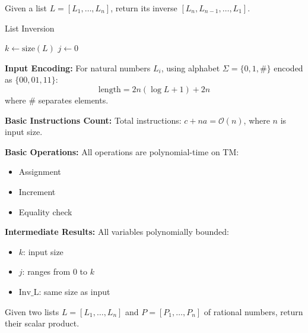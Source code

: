 \begin{ex}[FP function]
	Given a list $L = [L_1,\ldots,L_n]$, return its inverse $[L_n,L_{n-1},\ldots,L_1]$.
\end{ex}

\begin{solution}
	\begin{algorithm}
		\caption{List Inversion}\label{alg:inversion}
		$k \gets \text{size}(L)$\;
		$j \gets 0$\;
		\;
	\end{algorithm}

	\textbf{Input Encoding:}
	For natural numbers $L_i$, using alphabet $\Sigma = \{0,1,\#\}$ encoded as $\{00,01,11\}$:
	\[\text{length} = 2n(\log L + 1) + 2n\]
	where $\#$ separates elements.

	\textbf{Basic Instructions Count:}
	Total instructions: $c + na = \mathcal{O}(n)$, where $n$ is input size.

	\textbf{Basic Operations:}
	All operations are polynomial-time on TM:
	\begin{itemize}
		\item Assignment
		\item Increment
		\item Equality check
	\end{itemize}

	\textbf{Intermediate Results:}
	All variables polynomially bounded:
	\begin{itemize}
		\item $k$: input size
		\item $j$: ranges from $0$ to $k$
		\item $\text{Inv\_L}$: same size as input
	\end{itemize}
\end{solution}

\begin{ex}[FP function]
	Given two lists $L = [L_1,\ldots,L_n]$ and $P = [P_1,\ldots,P_n]$ of rational numbers, return their scalar product.
\end{ex}

